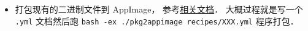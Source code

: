 
\begin{issues}
\issueDraft
\end{issues}

\begin{itemize}
\item 打包现有的二进制文件到 AppImage， 参考\href{https://docs.appimage.org/packaging-guide/converting-binary-packages/index.html#ref-convert-existing-binary-packages}{相关文档}． 大概过程就是写一个 \verb|.yml| 文档然后跑 \verb|bash -ex ./pkg2appimage recipes/XXX.yml| 程序打包．
\end{itemize}
